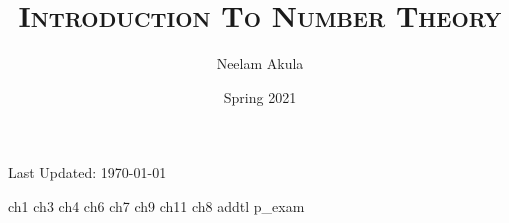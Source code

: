 \documentclass[fullpage]{article}
\title{\textsc{Introduction To Number Theory}}
\author{Neelam Akula}
\date{Spring 2021}
\newif\ifintro
\begin{document}
\pagestyle{empty}
\maketitle
\pagebreak
{\null\vfill\small Last Updated: \today}
\pagebreak

\setcounter{tocdepth}{2}
\tableofcontents
\newpage

\ifintro
\section*{Introduction}
\rule{\textwidth}{1pt}
\vspace{1.5in}
\paragraph{}
    This is a compilation of notes and homeworks for MATH 406,
    Introduction to Number Theory, to aid both current and future students
    in fully understanding the material. 
    The primary text used is \emph{Elementary Number Theory}, by Kenneth H. Rosen, 6th
    Edition. While the text is not required it is an excellent resource for additional
    problems. Chapters covered from the text are 1, 3, 4, 6, 7, 9, 11, and 8 in that order. With two
    midterms following chapters 1, 3, 4 and chapters 6, 7, 9. The final is cumulative with an
    emphasis on chapters 8 and 11.
    Lastly, the course is taught by Dr. Justin Wyss-Gallifent, on his personal site there are
    brief versions of each section's lecture notes. A list of his notes can be found
    \href{https://www.math.umd.edu/~immortal/MATH406/}{here}.
\addcontentsline{toc}{section}{Introduction}
\newpage
\fi

\pagestyle{plain}
{ch1}
\newpage
{ch3}
\newpage
{ch4}
\newpage
{ch6}
\newpage
{ch7}
\newpage
{ch9}
\newpage
{ch11}
\newpage
{ch8}
\newpage
{addtl}
\newpage
{p_exam}
\end{document}
